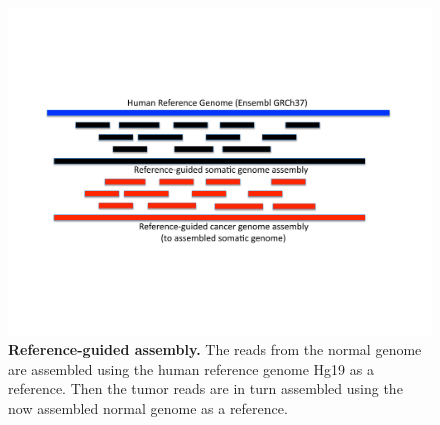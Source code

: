 \documentclass{easychithesis}
\begin{document}
\begin{figure}[!ht]
\begin{center}
\includegraphics[width = 0.95  \linewidth]{../Code/Figures/RefGuidedAssembly.pdf}
\end{center}
\caption{{\bf Reference-guided assembly.}  The reads from the normal genome are assembled using the human reference genome Hg19 as a reference. Then the tumor reads are in turn assembled using the now assembled normal genome as a reference.}
\label{fig:RefGuidedAssembly}
\end{figure}
\end{document}
